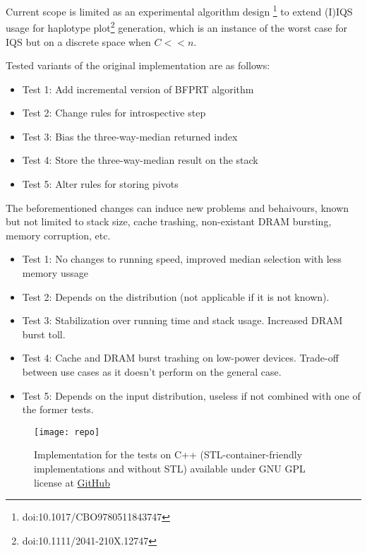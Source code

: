 \documentclass{beamer}
\begin{document}
\begin{frame}
    Current scope is limited as an experimental algorithm design \footnote{doi:10.1017/CBO9780511843747} to extend (I)IQS usage for haplotype plot\footnote{doi:10.1111/2041-210X.12747} generation, which is an instance of the worst case for IQS but on a discrete space when $C<<n$.
    \newline
    \newline

    Tested variants of the original implementation are as follows:
\begin{itemize}
    \item Test 1: Add incremental version of BFPRT algorithm%
    \item Test 2: Change rules for introspective step%
    \item Test 3: Bias the three-way-median returned index%
    \item Test 4: Store the three-way-median result on the stack
    \item Test 5: Alter rules for storing pivots
\end{itemize}
\end{frame}

\begin{frame}
    The beforementioned changes can induce new problems and behaivours, known but not limited to stack size, cache trashing, non-existant DRAM bursting, memory corruption, etc.
\begin{itemize}
    \item Test 1: No changes to running speed, improved median selection with less memory ussage
    \item Test 2: Depends on the distribution (not applicable if it is not known).
    \item Test 3: Stabilization over running time and stack usage. Increased DRAM burst toll.
    \item Test 4: Cache and DRAM burst trashing on low-power devices. Trade-off between use cases as it doesn't perform on the general case.
    \item Test 5: Depends on the input distribution, useless if not combined with one of the former tests.
\end{itemize}
\end{frame}


\begin{frame}
    \centering
    \begin{figure}
        \texttt{[image: repo]}\\
        \caption{Implementation for the tests on C++ (STL-container-friendly implementations and without STL) available under GNU GPL license at \href{https://github.com/KukyNekoi/magicode/tree/master/program/base_benchmark}{GitHub}}
    \end{figure}
\end{frame}
\end{document}
